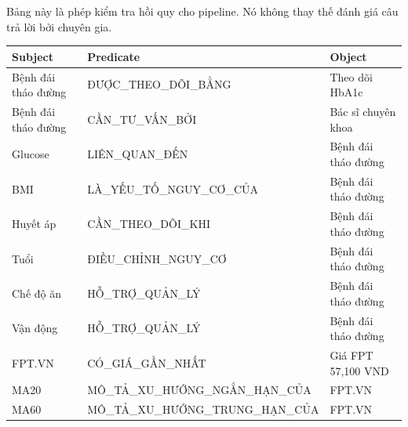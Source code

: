 Bảng này là phép kiểm tra hồi quy cho pipeline. Nó không thay thế đánh
giá câu trả lời bởi chuyên gia.

\label{tab:legacy-5.3}

{\def\LTcaptype{none} %
\begin{longtable}[]{@{}
  >{\raggedright\arraybackslash}p{}
  >{\centering\arraybackslash}p{}
  >{\centering\arraybackslash}p{}@{}}
\toprule\noalign{}
\begin{minipage}[b]{\linewidth}\raggedright
\textbf{Subject}
\end{minipage} & \begin{minipage}[b]{\linewidth}\centering
\textbf{Predicate}
\end{minipage} & \begin{minipage}[b]{\linewidth}\centering
\textbf{Object}
\end{minipage} \\
\midrule\noalign{}
\endhead
\bottomrule\noalign{}
\endlastfoot
Bệnh đái tháo đường & ĐƯỢC\_\allowbreak THEO\_\allowbreak DÕI\_\allowbreak BẰNG & Theo dõi HbA1c \\
Bệnh đái tháo đường & CẦN\_\allowbreak TƯ\_\allowbreak VẤN\_\allowbreak BỞI & Bác sĩ chuyên khoa \\
Glucose & LIÊN\_\allowbreak QUAN\_\allowbreak ĐẾN & Bệnh đái tháo đường \\
BMI & LÀ\_\allowbreak YẾU\_\allowbreak TỐ\_\allowbreak NGUY\_\allowbreak CƠ\_\allowbreak CỦA & Bệnh đái tháo đường \\
Huyết áp & CẦN\_\allowbreak THEO\_\allowbreak DÕI\_\allowbreak KHI & Bệnh đái tháo đường \\
Tuổi & ĐIỀU\_\allowbreak CHỈNH\_\allowbreak NGUY\_\allowbreak CƠ & Bệnh đái tháo đường \\
Chế độ ăn & HỖ\_\allowbreak TRỢ\_\allowbreak QUẢN\_\allowbreak LÝ & Bệnh đái tháo đường \\
Vận động & HỖ\_\allowbreak TRỢ\_\allowbreak QUẢN\_\allowbreak LÝ & Bệnh đái tháo đường \\
FPT.VN & CÓ\_\allowbreak GIÁ\_\allowbreak GẦN\_\allowbreak NHẤT & Giá FPT 57,100 VND \\
MA20 & MÔ\_\allowbreak TẢ\_\allowbreak XU\_\allowbreak HƯỚNG\_\allowbreak NGẮN\_\allowbreak HẠN\_\allowbreak CỦA & FPT.VN \\
MA60 & MÔ\_\allowbreak TẢ\_\allowbreak XU\_\allowbreak HƯỚNG\_\allowbreak TRUNG\_\allowbreak HẠN\_\allowbreak CỦA & FPT.VN \\

\end{longtable}}
